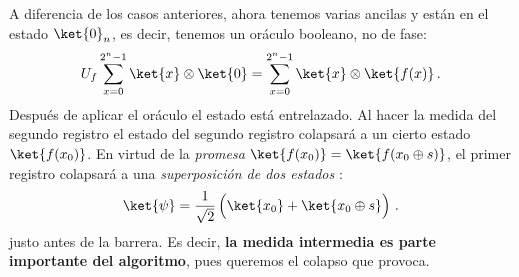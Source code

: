 \documentclass[a4paper,11pt]{book} %
\numberwithin{equation}{chapter}
\begin{document}
\begin{itemize}
	A diferencia de los casos anteriores, ahora tenemos varias ancilas y están en el estado $\ket{0}_n$, es decir, tenemos un oráculo booleano, no de fase:
	$$
	U_f \sum_{x=0}^{2^n-1}\ket{x}\otimes \ket{0}  = \sum_{x=0}^{2^n-1}\ket{x}\otimes \ket{f(x)} \,.
	$$
	Después de aplicar el oráculo el estado está entrelazado. Al hacer la medida del segundo registro  el estado del segundo registro colapsará a un cierto estado $\ket{f(x_0)}$. En virtud de la \textit{promesa }$\ket{f(x_0)} = \ket{f(x_0\oplus s)}$, el primer registro colapsará a una \textit{superposición de dos estados} :
	$$
	\ket{\psi} = \frac{1}{\sqrt{2}} \left( \rule{0mm}{4mm} \ket{x_0} + \ket{x_0 \oplus s} \right) \,.
	$$
	justo antes de la barrera. Es decir, \textbf{la medida intermedia es parte importante del algoritmo}, pues queremos el colapso que provoca. 
	

\end{itemize}
\end{document}
